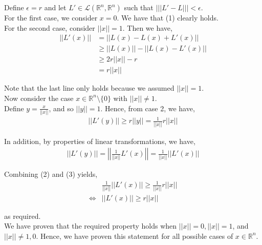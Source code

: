 \documentclass[12pt]{article}
\begin{document}
Define $\epsilon = r$ and let $L' \in \mathscr{L}(\mathbb{R}^n, \mathbb{R}^n)$ such that $|||L' - L||| < \epsilon$.\\

For the first case, we consider $x = 0$. We have that (1) clearly holds.\\

For the second case, consider $||x|| = 1$. Then we have,
\begin{align*}
||L'(x)|| &= ||L(x) - L(x) + L'(x)||\\
&\geq ||L(x)|| - ||L(x) - L'(x)||\\
&\geq 2r||x|| - r\\
&= r||x||
\end{align*}

Note that the last line only holds because we assumed $||x|| = 1$.\\

Now consider the case $x \in \mathbb{R}^n \setminus \{0\}$ with $||x|| \neq 1$.\\

Define $y = \frac{x}{||x||}$, and so $||y|| = 1$. Hence, from case 2, we have,
\begin{align}
||L'(y)|| \geq r||y|| = \frac{1}{||x||} r||x||
\end{align}

In addition, by properties of linear transformations, we have,
\begin{align}
||L'(y)|| = \left|\left| \frac{1}{||x||} L'(x)\right|\right| = \frac{1}{||x||} ||L'(x)||
\end{align}

Combining (2) and (3) yields,
\begin{align*}
&\frac{1}{||x||} ||L'(x)|| \geq \frac{1}{||x||} r||x||\\
\iff &||L'(x)|| \geq r||x||
\end{align*}

as required.\\

We have proven that the required property holds when $||x|| = 0, ||x|| = 1$, and $||x|| \neq 1, 0$. Hence, we have proven this statement for all possible cases of $x \in \mathbb{R}^n$.
\end{document}
